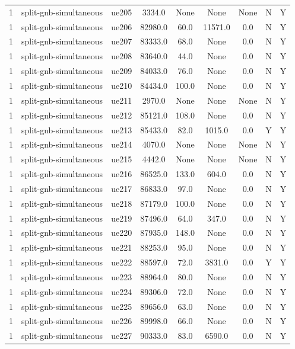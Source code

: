 \begin{table}[ht]
\begin{tabular}{|c|c|c|c|c|c|c|c|c|}
1 & split-gnb-simultaneous & ue205 & 3334.0 & None & None & None & N & Y \\
1 & split-gnb-simultaneous & ue206 & 82980.0 & 60.0 & 11571.0 & 0.0 & N & Y \\
1 & split-gnb-simultaneous & ue207 & 83333.0 & 68.0 & None & 0.0 & N & Y \\
1 & split-gnb-simultaneous & ue208 & 83640.0 & 44.0 & None & 0.0 & N & Y \\
1 & split-gnb-simultaneous & ue209 & 84033.0 & 76.0 & None & 0.0 & N & Y \\
1 & split-gnb-simultaneous & ue210 & 84434.0 & 100.0 & None & 0.0 & N & Y \\
1 & split-gnb-simultaneous & ue211 & 2970.0 & None & None & None & N & Y \\
1 & split-gnb-simultaneous & ue212 & 85121.0 & 108.0 & None & 0.0 & N & Y \\
1 & split-gnb-simultaneous & ue213 & 85433.0 & 82.0 & 1015.0 & 0.0 & Y & Y \\
1 & split-gnb-simultaneous & ue214 & 4070.0 & None & None & None & N & Y \\
1 & split-gnb-simultaneous & ue215 & 4442.0 & None & None & None & N & Y \\
1 & split-gnb-simultaneous & ue216 & 86525.0 & 133.0 & 604.0 & 0.0 & N & Y \\
1 & split-gnb-simultaneous & ue217 & 86833.0 & 97.0 & None & 0.0 & N & Y \\
1 & split-gnb-simultaneous & ue218 & 87179.0 & 100.0 & None & 0.0 & N & Y \\
1 & split-gnb-simultaneous & ue219 & 87496.0 & 64.0 & 347.0 & 0.0 & N & Y \\
1 & split-gnb-simultaneous & ue220 & 87935.0 & 148.0 & None & 0.0 & N & Y \\
1 & split-gnb-simultaneous & ue221 & 88253.0 & 95.0 & None & 0.0 & N & Y \\
1 & split-gnb-simultaneous & ue222 & 88597.0 & 72.0 & 3831.0 & 0.0 & Y & Y \\
1 & split-gnb-simultaneous & ue223 & 88964.0 & 80.0 & None & 0.0 & N & Y \\
1 & split-gnb-simultaneous & ue224 & 89306.0 & 72.0 & None & 0.0 & N & Y \\
1 & split-gnb-simultaneous & ue225 & 89656.0 & 63.0 & None & 0.0 & N & Y \\
1 & split-gnb-simultaneous & ue226 & 89998.0 & 66.0 & None & 0.0 & N & Y \\
1 & split-gnb-simultaneous & ue227 & 90333.0 & 83.0 & 6590.0 & 0.0 & N & Y \\

\end{tabular}
\end{table}
